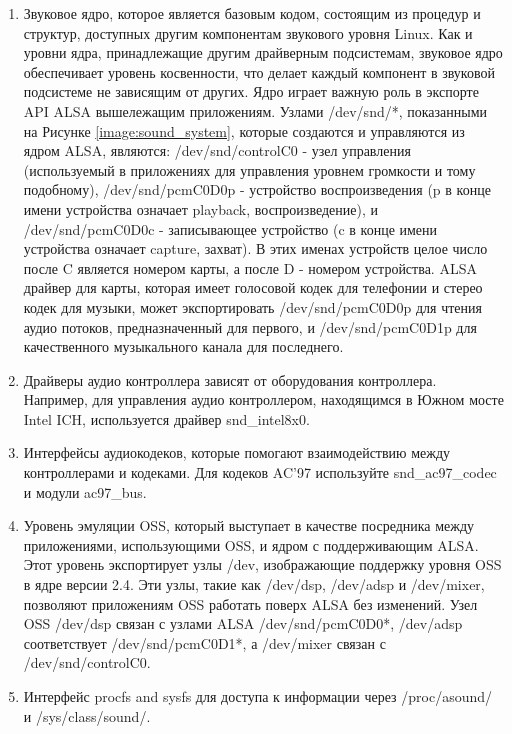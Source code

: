 \begin{enumerate}
\item Звуковое ядро, которое является базовым кодом, состоящим из процедур и структур, доступных другим компонентам звукового уровня Linux. Как и уровни ядра, принадлежащие другим драйверным подсистемам, звуковое ядро обеспечивает уровень косвенности, что делает каждый компонент в звуковой подсистеме не зависящим от других. Ядро играет важную роль в экспорте API ALSA вышележащим приложениям. Узлами /dev/snd/*, показанными на Рисунке \ref{image:sound_system}, которые создаются и управляются из ядром ALSA, являются: /dev/snd/controlC0 - узел управления (используемый в приложениях для управления уровнем громкости и тому подобному), /dev/snd/pcmC0D0p - устройство воспроизведения (p в конце имени устройства означает playback, воспроизведение), и /dev/snd/pcmC0D0c - записывающее устройство (c в конце имени устройства означает capture, захват). В этих именах устройств целое число после C является номером карты, а после D - номером устройства. ALSA драйвер для карты, которая имеет голосовой кодек для телефонии и стерео кодек для музыки, может экспортировать /dev/snd/pcmC0D0p для чтения аудио потоков, предназначенный для первого, и /dev/snd/pcmC0D1p для качественного музыкального канала для последнего.
 
\item Драйверы аудио контроллера зависят от оборудования контроллера. Например, для управления аудио контроллером, находящимся в Южном мосте Intel ICH, используется драйвер snd\_intel8x0.
 
\item Интерфейсы аудиокодеков, которые помогают взаимодействию между контроллерами и кодеками. Для кодеков AC'97 используйте snd\_ac97\_codec и модули ac97\_bus.
 
\item Уровень эмуляции OSS, который выступает в качестве посредника между приложениями, использующими OSS, и ядром с поддерживающим ALSA. Этот уровень экспортирует узлы /dev, изображающие поддержку уровня OSS в ядре версии 2.4. Эти узлы, такие как /dev/dsp, /dev/adsp и /dev/mixer, позволяют приложениям OSS работать поверх ALSA без изменений. Узел OSS /dev/dsp связан с узлами ALSA /dev/snd/pcmC0D0*, /dev/adsp соответствует /dev/snd/pcmC0D1*, а /dev/mixer связан с /dev/snd/controlC0.
 
\item Интерфейс procfs and sysfs для доступа к информации через /proc/asound/ и /sys/class/sound/.
 

\end{enumerate}
